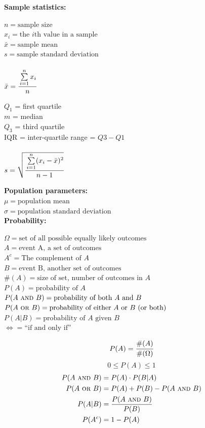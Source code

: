 \documentclass[12pt,letterpaper,addpoints,answers]{exam}
\begin{document}

\newpage

{\bf Sample statistics:}\vspace{-10pt}
\begin{multicols}{2}\noindent
$n=\text{sample size} $\\
$x_i=\text{the $i$th value in a sample} $\\
$\bar x = \text{sample mean}$\\
$s = \text{sample standard deviation}$\\\\
$\bar x = \cfrac{\sum\limits_{i=1}^n x_i}{n}$

\columnbreak \noindent
$Q_1$ = first quartile\\
$m$ = median\\
$Q_3$ = third quartile\\
IQR = inter-quartile range = $Q3-Q1$\\\\
$s = \sqrt{\cfrac{\sum\limits_{i=1}^n (x_i-\bar x)^2}{n-1}}$ 
\end{multicols}

{\bf Population parameters:}\\
$\mu = \text{population mean}$\\
$\sigma = \text{population standard deviation}$\\

{\bf Probability:}
\begin{multicols}{2} \noindent
$\Omega = \text{set of all possible equally likely outcomes}$\\
$A = \text{event A, a set of outcomes}$\\
$A^c = \text{The complement of }A$\\
$B = \text{event B, another set of outcomes}$\\
$\#(A) = \text{size of set, number of outcomes in } A$\\
$P(A) = \text{probability of }A$\\
$P(A ~\textsc{and}~ B) = \text{probability of both $A$ and $B$}$\\
$P(A ~\textsc{or}~ B) = \text{probability of either $A$ or $B$ (or both)}$\\
$P(A | B) = \text{probability of $A$ given $B$}$\\
$\iff = \text{``if and only if''}$
\columnbreak

$$P(A) = \cfrac{\#(A)}{\#(\Omega)}$$
$$0 \le P(A) \le 1$$
\begin{align*}
P(A ~\textsc{and}~ B) &= P(A) \cdot P(B|A) \\
P(A ~\textsc{or}~ B) &= P(A) + P(B) - P(A~\textsc{and}~ B)\\
P(A|B) &= \frac{P(A ~\textsc{and}~ B)}{P(B)} \\
P(A^c) &= 1 - P(A)
\end{align*}
\end{multicols}
\end{document}
